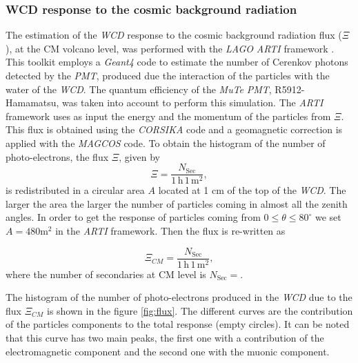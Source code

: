 \documentclass[submitting]{nst}
\begin{document}
\subsubsection{WCD response to the cosmic background radiation}%
The estimation of the \textsl{WCD} response to the cosmic background radiation flux ($\Xi$), at the CM volcano level, was performed with the \textsl{LAGO} \textsl{ARTI} framework \cite{SarmientoEtal2019}. This toolkit employs a \textsl{Geant4} code to estimate the number of Cerenkov photons detected by the \textsl{PMT}, produced due the interaction of the particles with the water of the \textsl{WCD}. The quantum efficiency of the \textsl{MuTe} \textsl{PMT}, R5912-Hamamatsu, was taken into account to perform this simulation. The \textsl{ARTI} framework uses as input the energy and the momentum of the particles from $\Xi$. This flux is obtained using the \textsl{CORSIKA} code and a geomagnetic correction is applied with the \textsl{MAGCOS} code. To obtain the histogram of the number of photo-electrons, the flux $\Xi$, given by
\begin{equation}
\Xi = \frac{N_{\mathrm{Sec}}}{1\,\mathrm{h}\, 1\,\mathrm{m}^2}, 
\end{equation}
is redistributed in a circular area $A$ located at 1 cm of the top of the \textsl{WCD}. The larger the area the larger the number of particles coming in almost all the zenith angles. In order to get the response of particles coming from $0\leq \theta \leq 80^{\circ}$ we set $A=480$m$^2$ in the \textsl{ARTI} framework. Then the flux is re-written as

\begin{equation}
\Xi_{CM} = \frac{N_{\mathrm{Sec}}}{1\,\mathrm{h}\, 1\,\mathrm{m}^2}, 
\end{equation}
where the number of secondaries at CM level is $N_{\mathrm{Sec}}=$.

The histogram of the number of photo-electrons produced in the \textsl{WCD} due to the flux $\Xi_{CM}$ is shown in the figure \ref{fig:flux}. The different curves are the contribution of the particles components to the total response (empty circles). It can be noted that this curve has two main peaks, the first one with a contribution of the electromagnetic component and the second one with the muonic component.
\end{document}

